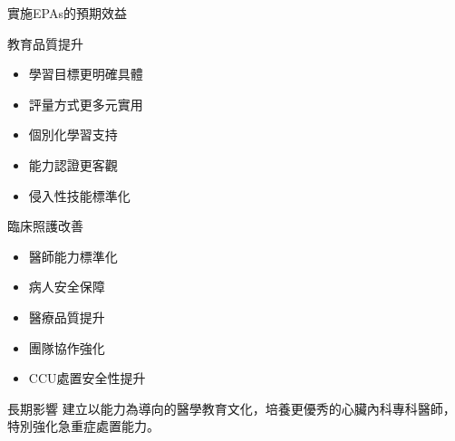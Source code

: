 \documentclass[aspectratio=169]{beamer}
\begin{document}
\begin{frame}{實施EPAs的預期效益}
\begin{block}{教育品質提升}
\begin{itemize}
\item 學習目標更明確具體
\item 評量方式更多元實用
\item 個別化學習支持
\item 能力認證更客觀
\item \textcolor{emergency_red}{侵入性技能標準化}
\end{itemize}
\end{block}

\begin{block}{臨床照護改善}
\begin{itemize}
\item 醫師能力標準化
\item 病人安全保障
\item 醫療品質提升
\item 團隊協作強化
\item \textcolor{emergency_red}{CCU處置安全性提升}
\end{itemize}
\end{block}

\begin{alertblock}{長期影響}
建立以能力為導向的醫學教育文化，培養更優秀的心臟內科專科醫師，特別強化急重症處置能力。
\end{alertblock}
\end{frame}
\end{document}
